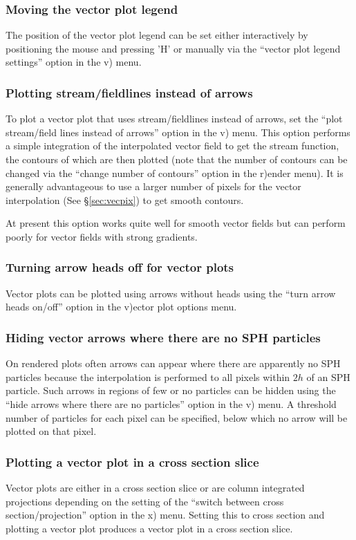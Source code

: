 \documentclass[a4paper,10pt]{article}
\begin{document}
\subsubsection{ Moving the vector plot legend}
 The position of the vector plot legend can be set either interactively by positioning the mouse and pressing 'H' or manually via the ``vector plot legend settings'' option in the v) menu.

\subsubsection{ Plotting stream/fieldlines instead of arrows}
 To plot a vector plot that uses stream/fieldlines instead of arrows, set the ``plot stream/field lines instead of arrows'' option in the v) menu. This option performs a simple integration of the interpolated vector field to get the stream function, the contours of which are then plotted (note that the number of contours can be changed via the ``change number of contours'' option in the r)ender menu). It is generally advantageous to use a larger number of pixels for the vector interpolation (See \S\ref{sec:vecpix}) to get smooth contours.
 
  At present this option works quite well for smooth vector fields but can perform poorly for vector fields with strong gradients.

\subsubsection{ Turning arrow heads off for vector plots}
 Vector plots can be plotted using arrows without heads using the ``turn arrow heads on/off'' option in the v)ector plot options menu.

\subsubsection{ Hiding vector arrows where there are no SPH particles}
 On rendered plots often arrows can appear where there are apparently no SPH particles because the interpolation is performed to all pixels within $2h$ of an SPH particle. Such arrows in regions of few or no particles can be hidden using the ``hide arrows where there are no particles'' option in the v) menu. A threshold number of particles for each pixel can be specified, below which no arrow will be plotted on that pixel.

\subsubsection{ Plotting a vector plot in a cross section slice}
 Vector plots are either in a cross section slice or are column integrated projections depending on the setting of the ``switch between cross section/projection'' option in the x) menu. Setting this to cross section and plotting a vector plot produces a vector plot in a cross section slice.
\end{document}

